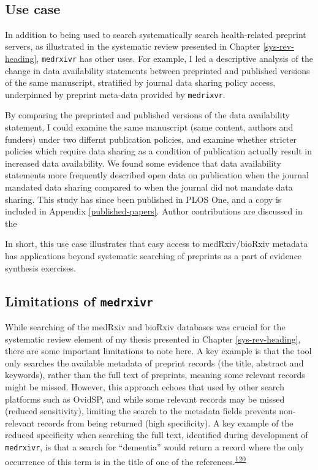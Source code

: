 \documentclass[a4paper, twoside]{templates/ociamthesis}
\begin{document}
~

\hypertarget{use-case}{%
\subsection{Use case}\label{use-case}}

In addition to being used to search systematically search health-related preprint servers, as illustrated in the systematic review presented in Chapter \ref{sys-rev-heading}, \texttt{medrxivr} has other uses. For example, I led a descriptive analysis of the change in data availability statements between preprinted and published versions of the same manuscript, stratified by journal data sharing policy access, underpinned by preprint meta-data provided by \texttt{medrixvr}.

By comparing the preprinted and published versions of the data availability statement, I could examine the same manuscript (same content, authors and funders) under two differnt publication policies, and examine whether stricter policies which require data sharing as a condition of publication actually result in increased data availability. We found some evidence that data availability statements more frequently described open data on publication when the journal mandated data sharing compared to when the journal did not mandate data sharing. This study has since been published in PLOS One, and a copy is included in Appendix \ref{published-papers}. Author contributions are discussed in the

In short, this use case illustrates that easy access to medRxiv/bioRxiv metadata has applications beyond systematic searching of preprints as a part of evidence synthesis exercises.

\hypertarget{medrxivr-limitations}{%
\subsection{\texorpdfstring{Limitations of \texttt{medrxivr}}{Limitations of medrxivr}}\label{medrxivr-limitations}}

While searching of the medRxiv and bioRxiv databases was crucial for the systematic review element of my thesis presented in Chapter \ref{sys-rev-heading}, there are some important limitations to note here. A key example is that the tool only searches the available metadata of preprint records (the title, abstract and keywords), rather than the full text of preprints, meaning some relevant records might be missed. However, this approach echoes that used by other search platforms such as OvidSP, and while some relevant records may be missed (reduced sensitivity), limiting the search to the metadata fields prevents non-relevant records from being returned (high specificity). A key example of the reduced specificity when searching the full text, identified during development of \texttt{medrxivr}, is that a search for ``dementia'' would return a record where the only occurrence of this term is in the title of one of the references.\textsuperscript{\protect\hyperlink{ref-bong2019}{120}}
\end{document}
